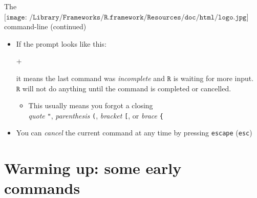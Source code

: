 \documentclass[
  11pt,
  ignorenonframetext,
]{beamer}
\newenvironment{Shaded}{\begin{snugshade}}{\end{snugshade}}
\newcommand{\AlertTok}[1]{\textcolor[rgb]{0.94,0.16,0.16}{#1}}
\newcommand{\NormalTok}[1]{#1}
\newcommand{\StringTok}[1]{\textcolor[rgb]{0.31,0.60,0.02}{#1}}
\providecommand{\tightlist}{%
  \setlength{\itemsep}{0pt}\setlength{\parskip}{0pt}}
\begin{document}
\begin{frame}{The
\(\texttt{[image: /Library/Frameworks/R.framework/Resources/doc/html/logo.jpg]}\)
command-line (continued)}
\protect\hypertarget{the-includegraphicsheight1emlibraryframeworksr.frameworkresourcesdochtmllogo.jpg-command-line-continued}{}
\begin{itemize}
\item
  If the prompt looks like this:

\begin{Shaded}
\begin{Highlighting}[]
\NormalTok{+}
\end{Highlighting}
\end{Shaded}

  it means the last command was \emph{incomplete} and \(\texttt{R}\) is
  waiting for more input.\\
  \(\texttt{R}\) will not do anything until the command is completed or
  cancelled.

  \begin{itemize}
  \tightlist
  \item
    This usually means you forgot a closing\\
    \emph{quote} \AlertTok{\texttt{"}}, \emph{parenthesis}
    \AlertTok{\texttt{(}}, \emph{bracket} \AlertTok{\texttt{[}}, or
    \emph{brace} \AlertTok{\texttt{\{}}
  \end{itemize}
\item
  \StringTok{You can \textit{cancel} the current command at any time by pressing \texttt{escape}}
  (\AlertTok{\texttt{esc}})
\end{itemize}
\end{frame}

\hypertarget{warming-up-some-early-commands}{%
\section{Warming up: some early
commands}\label{warming-up-some-early-commands}}
\end{document}
